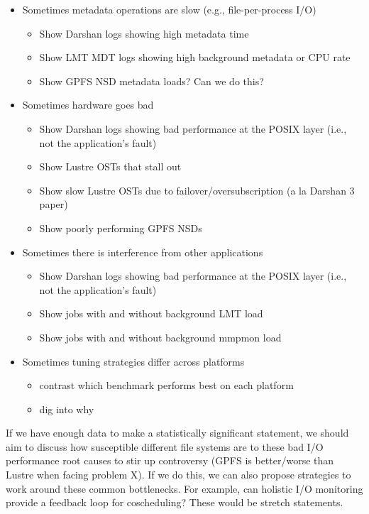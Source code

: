 \documentclass[conference,10pt,compsocconf]{IEEEtran}
\begin{document}
\begin{itemize}
\item Sometimes metadata operations are slow (e.g., file-per-process I/O)
    \begin{itemize}
    \item Show Darshan logs showing high metadata time
    \item Show LMT MDT logs showing high background metadata or CPU rate
    \item Show GPFS NSD metadata loads?  Can we do this?
    \end{itemize}
\item Sometimes hardware goes bad
    \begin{itemize}
    \item Show Darshan logs showing bad performance at the POSIX layer (i.e., not the
    application's fault)
    \item Show Lustre OSTs that stall out
    \item Show slow Lustre OSTs due to failover/oversubscription (a la Darshan 3 paper)
    \item Show poorly performing GPFS NSDs
    \end{itemize}
\item Sometimes there is interference from other applications
    \begin{itemize}
    \item Show Darshan logs showing bad performance at the POSIX layer (i.e., not the
    application's fault)
    \item Show jobs with and without background LMT load
    \item Show jobs with and without background mmpmon load
    \end{itemize}
\item Sometimes tuning strategies differ across platforms
    \begin{itemize}
    \item contrast which benchmark performs best on each platform
    \item dig into why
    \end{itemize}
\end{itemize}

If we have enough data to make a statistically significant statement, we should
aim to discuss how susceptible different file systems are to these bad I/O
performance root causes to stir up controversy (GPFS is better/worse than
Lustre when facing problem X).  If we do this, we can also propose strategies
to work around these common bottlenecks.  For example, can holistic I/O
monitoring provide a feedback loop for coscheduling?  These would be stretch
statements.
\end{document}
